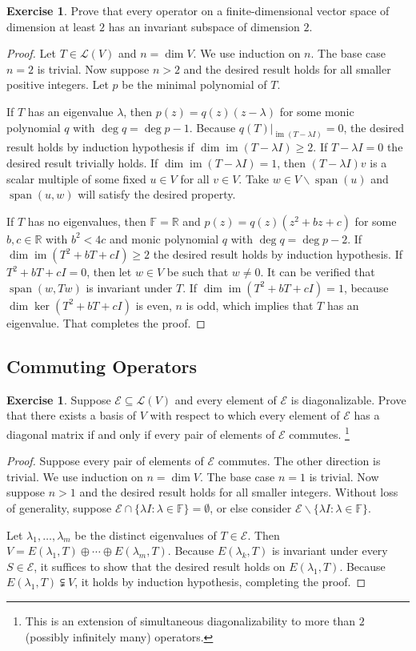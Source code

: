 \documentclass[nofonts,colorlinks]{tufte-handout}
\theoremstyle{plain} %
\theoremstyle{definition}
\newtheorem{exer}[thm]{Exercise}
\theoremstyle{remark}
\newcommand{\rest}[2]{\mathopen{}\left.#1\right|_{#2}}
\newcommand{\R}{\mathbb{R}}
\newcommand{\F}{\mathbb{F}}
\renewcommand{\L}{\mathcal{L}}
\newcommand{\E}{\mathcal{E}}
\DeclareMathOperator{\spn}{span}
\DeclareMathOperator{\im}{im}
\begin{document}
\begin{exer}
	Prove that every operator on a finite-dimensional vector space of dimension at least $2$ has an invariant subspace of dimension $2$.
\end{exer}
\begin{proof}
	Let $T\in\L(V)$ and $n=\dim V$. We use induction on $n$. The base case $n=2$ is trivial. Now suppose $n>2$ and the desired result holds for all smaller positive integers. Let $p$ be the minimal polynomial of $T$.

	If $T$ has an eigenvalue $\lambda$, then $p(z)=q(z)(z-\lambda)$ for some monic polynomial $q$ with $\deg q=\deg p-1$. Because $\rest{q(T)}{\im(T-\lambda I)}=0$, the desired result holds by induction hypothesis if $\dim\im(T-\lambda I)\geq2$. If $T-\lambda I=0$ the desired result trivially holds. If $\dim\im(T-\lambda I)=1$, then $(T-\lambda I)v$ is a scalar multiple of some fixed $u\in V$ for all $v\in V$. Take $w\in V\backslash\spn(u)$ and $\spn(u,w)$ will satisfy the desired property.

	If $T$ has no eigenvalues, then $\F=\R$ and $p(z)=q(z)(z^2+bz+c)$ for some $b,c\in\R$ with $b^2<4c$ and monic polynomial $q$ with $\deg q=\deg p-2$. If $\dim\im(T^2+bT+cI)\geq2$ the desired result holds by induction hypothesis. If $T^2+bT+cI=0$, then let $w\in V$ be such that $w\neq0$. It can be verified that $\spn(w,Tw)$ is invariant under $T$. If $\dim\im(T^2+bT+cI)=1$, because $\dim\ker(T^2+bT+cI)$ is even, $n$ is odd, which implies that $T$ has an eigenvalue. That completes the proof.
\end{proof}



\subsection{Commuting Operators}
\begin{exer}
	Suppose $\E\subseteq\L(V)$ and every element of $\E$ is diagonalizable. Prove that there exists a basis of $V$ with respect to which every element of $\E$ has a diagonal matrix if and only if every pair of elements of $\E$ commutes.%
	\footnote{This is an extension of simultaneous diagonalizability to more than $2$ (possibly infinitely many) operators.}
\end{exer}
\begin{proof}
	Suppose every pair of elements of $\E$ commutes. The other direction is trivial. We use induction on $n=\dim V$. The base case $n=1$ is trivial. Now suppose $n>1$ and the desired result holds for all smaller integers. Without loss of generality, suppose $\E\cap\{\lambda I:\lambda\in\F\}=\emptyset$, or else consider $\E\backslash\{\lambda I:\lambda\in\F\}$.

	Let $\lambda_1,\dots,\lambda_m$ be the distinct eigenvalues of $T\in\E$. Then $V=E(\lambda_1,T)\oplus\cdots\oplus E(\lambda_m,T)$. Because $E(\lambda_k,T)$ is invariant under every $S\in\E$, it suffices to show that the desired result holds on $E(\lambda_1,T)$. Because $E(\lambda_1,T)\subsetneqq V$, it holds by induction hypothesis, completing the proof.
\end{proof}
\end{document}
